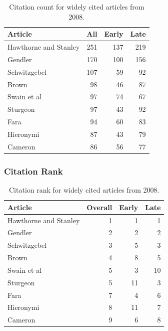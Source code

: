 \documentclass[
  10pt,
  letterpaper,
  DIV=11,
  numbers=noendperiod,
  twoside]{scrartcl}
\begin{document}
\begin{longtable}[]{@{}lrrr@{}}

\caption{\label{tbl-citation-count-2008}Citation count for widely cited
articles from 2008.}

\tabularnewline

\toprule\noalign{}
Article & All & Early & Late \\
\midrule\noalign{}
\endhead
\bottomrule\noalign{}
\endlastfoot
Hawthorne and Stanley & 251 & 137 & 219 \\
Gendler & 170 & 100 & 156 \\
Schwitzgebel & 107 & 59 & 92 \\
Brown & 98 & 46 & 87 \\
Swain et al & 97 & 74 & 67 \\
Sturgeon & 97 & 43 & 92 \\
Fara & 94 & 60 & 83 \\
Hieronymi & 87 & 43 & 79 \\
Cameron & 86 & 56 & 77 \\

\end{longtable}

\subsubsection*{Citation Rank}\label{citation-rank-32}

\begin{longtable}[]{@{}lrrr@{}}

\caption{\label{tbl-citation-rank-2008}Citation rank for widely cited
articles from 2008.}

\tabularnewline

\toprule\noalign{}
Article & Overall & Early & Late \\
\midrule\noalign{}
\endhead
\bottomrule\noalign{}
\endlastfoot
Hawthorne and Stanley & 1 & 1 & 1 \\
Gendler & 2 & 2 & 2 \\
Schwitzgebel & 3 & 5 & 3 \\
Brown & 4 & 8 & 5 \\
Swain et al & 5 & 3 & 10 \\
Sturgeon & 5 & 11 & 3 \\
Fara & 7 & 4 & 6 \\
Hieronymi & 8 & 11 & 7 \\
Cameron & 9 & 6 & 8 \\

\end{longtable}
\end{document}
